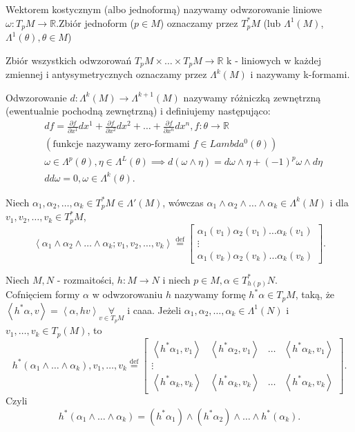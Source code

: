 \documentclass{article}
\begin{document}
\begin{definicja}Wektorem kostycznym (albo jednoformą) nazywamy odwzorowanie liniowe  $\omega: T_pM\to\mathbb{R}$.Zbiór jednoform ($p\in M$) oznaczamy przez $T_p^* M$ (lub $\Lambda^1(M)$, $\Lambda^1(\theta), \theta\in M$)\end{definicja}\begin{definicja}Zbiór wszystkich odwzorowań $T_pM \times \ldots \times T_pM \to \mathbb{R}$ k - liniowych w każdej zmiennej i antysymetrycznych oznaczamy przez $\Lambda^k(M)$ i nazywamy k-formami.\end{definicja}\begin{definicja}Odwzorowanie $d: \Lambda^k(M)\to\Lambda^{k+1}(M)$ nazywamy różniczką zewnętrzną (ewentualnie pochodną zewnętrzną) i definiujemy następująco:\begin{align*}&df = \frac{\partial f}{\partial x^1} dx^1 + \frac{\partial f}{\partial x^2} dx^2 + \ldots + \frac{\partial f}{\partial x^n} dx^n, f: \theta \to \mathbb{R}\\&(\text{funkcje nazywamy zero-formami }f\in Lambda^0(\theta))\\&\omega\in\Lambda^p(\theta), \eta\in \Lambda^L(\theta) \implies d(\omega\land\eta) = d\omega\land\eta + (-1)^p\omega\land d\eta \\&dd\omega = 0, \omega\in\Lambda^k(\theta).\end{align*}\end{definicja}
\begin{definicja}Niech $\alpha_1,\alpha_2,\ldots,\alpha_k\in T_p^*M\in\Lambda'(M)$, wówczas $\alpha_1\land\alpha_2\land\ldots\land\alpha_k\in \Lambda^k(M)$ i dla $v_1,v_2,\ldots,v_k\in T_p^*M$,\[\left<\alpha_1\land\alpha_2\land\ldots\land\alpha_k; v_1,v_2,\ldots,v_k \right> \overset{\text{def}}{=}  \begin{bmatrix} \alpha_1(v_1)\alpha_2(v_1)\ldots\alpha_k(v_1)\\ \vdots \\ \alpha_1(v_k)\alpha_2(v_k)\ldots\alpha_k(v_k) \end{bmatrix}.\]\end{definicja}
\begin{definicja}Niech $M, N$ - rozmaitości, $h: M\to N$ i niech $p\in M, \alpha\in T^*_{h(p)}N$.\\Cofnięciem formy $\alpha$ w odwzorowaniu $h$ nazywamy formę $h^*\alpha \in T_pM$, taką, że $\left<h^*\alpha,v \right> = \left<\alpha,hv \right>\underset{v\in T_pM}{\forall} $ i caaa. Jeżeli $\alpha_1,\alpha_2,\ldots,\alpha_k \in \Lambda^1(N)$ i $v_1,\ldots,v_k\in T_p(M)$, to\[h^*(\alpha_1\land\ldots\land\alpha_k), v_1,\ldots,v_k \overset{\text{def}}{=} \begin{bmatrix} \left<h^*\alpha_1,v_1 \right>&\left<h^*\alpha_2,v_1 \right>&\ldots&\left<h^*\alpha_k,v_1 \right> \\\vdots &&&\\\left<h^*\alpha_k,v_k \right>&\left<h^*\alpha_k, v_k \right>&\ldots&\left<h^*\alpha_k,v_k \right>\end{bmatrix}.\]Czyli\[h^*(\alpha_1\land\ldots\land\alpha_k) = (h^*\alpha_1)\land(h^*\alpha_2)\land\ldots\land h^*(\alpha_k).\]\end{definicja}
\end{document}

